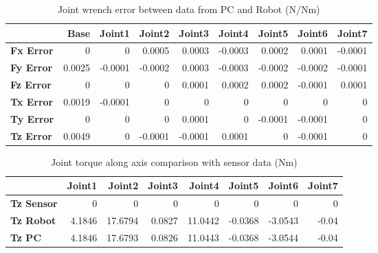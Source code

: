 \begin{table}[h!]
	\centering
	\caption{Joint wrench error between data from PC and Robot (N/Nm)}
	\label{wrech_Error_Pose8}
	\begin{tabular}{|l|r|r|r|r|r|r|r|r|}
		\hline
		\textbf{}  & \textbf{Base} & \textbf{Joint1}  & \textbf{Joint2}  & \textbf{Joint3}  & \textbf{Joint4}  & \textbf{Joint5}  & \textbf{Joint6}  & \textbf{Joint7} \\ \hline
		\textbf{Fx Error}  & 0        & 0        & 0.0005        & 0.0003        & -0.0003        & 0.0002        & 0.0001        & -0.0001 \\ \hline
		\textbf{Fy Error}  & 0.0025        & -0.0001        & -0.0002        & 0.0003        & -0.0003        & -0.0002        & -0.0002        & -0.0001 \\ \hline
		\textbf{Fz Error}  & 0        & 0        & 0        & 0.0001        & 0.0002        & 0.0002        & -0.0001        & 0.0001 \\ \hline
		\textbf{Tx Error}  & 0.0019        & -0.0001        & 0        & 0        & 0        & 0        & 0        & 0 \\ \hline
		\textbf{Ty Error}  & 0        & 0        & 0        & 0.0001        & 0        & -0.0001        & -0.0001        & 0 \\ \hline
		\textbf{Tz Error}  & 0.0049        & 0        & -0.0001        & -0.0001        & 0.0001        & 0        & -0.0001        & 0 \\ \hline
	\end{tabular}
\end{table}

\begin{table}[h!]
	\centering
	\caption{Joint torque along axis comparison with sensor data (Nm)}
	\label{wrech_Sensor_Pose8}
	\begin{tabular}{|l|r|r|r|r|r|r|r|}
		\hline
		\textbf{} & \textbf{Joint1} & \textbf{Joint2} & \textbf{Joint3} & \textbf{Joint4} & \textbf{Joint5} & \textbf{Joint6} & \textbf{Joint7} \\ \hline
		\textbf{Tz Sensor}  & 0           & 0           & 0            & 0           & 0           & 0           & 0           \\ \hline
		\textbf{Tz Robot}  	& 4.1846           & 17.6794           & 0.0827            & 11.0442           & -0.0368           & -3.0543           & -0.04           \\ \hline
		\textbf{Tz PC}  	& 4.1846           & 17.6793           & 0.0826            & 11.0443           & -0.0368           & -3.0544           & -0.04           \\ \hline
	\end{tabular}
\end{table}

